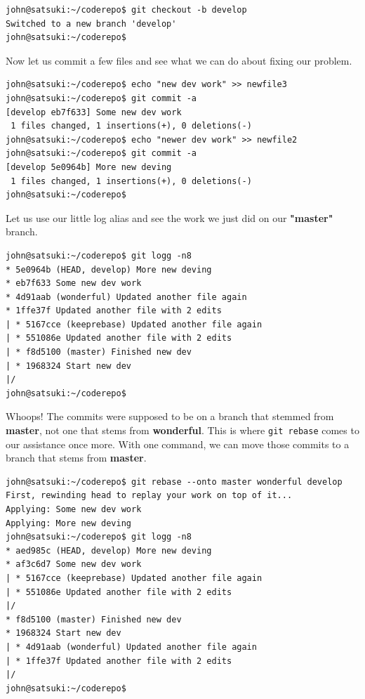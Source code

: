 \begin{Verbatim}
john@satsuki:~/coderepo$ git checkout -b develop
Switched to a new branch 'develop'
john@satsuki:~/coderepo$
\end{Verbatim}

Now let us commit a few files and see what we can do about fixing our problem.

\begin{Verbatim}
john@satsuki:~/coderepo$ echo "new dev work" >> newfile3
john@satsuki:~/coderepo$ git commit -a
[develop eb7f633] Some new dev work
 1 files changed, 1 insertions(+), 0 deletions(-)
john@satsuki:~/coderepo$ echo "newer dev work" >> newfile2
john@satsuki:~/coderepo$ git commit -a
[develop 5e0964b] More new deving
 1 files changed, 1 insertions(+), 0 deletions(-)
john@satsuki:~/coderepo$
\end{Verbatim}

Let us use our little log alias and see the work we just did on our \textbf{"master"} branch.

\begin{Verbatim}
john@satsuki:~/coderepo$ git logg -n8
* 5e0964b (HEAD, develop) More new deving
* eb7f633 Some new dev work
* 4d91aab (wonderful) Updated another file again
* 1ffe37f Updated another file with 2 edits
| * 5167cce (keeprebase) Updated another file again
| * 551086e Updated another file with 2 edits
| * f8d5100 (master) Finished new dev
| * 1968324 Start new dev
|/
john@satsuki:~/coderepo$
\end{Verbatim}

Whoops! The commits were supposed to be on a branch that stemmed from \textbf{master}, not one that stems from \textbf{wonderful}.
This is where \texttt{git rebase} comes to our assistance once more.
With one command, we can move those commits to a branch that stems from \textbf{master}.

\begin{Verbatim}
john@satsuki:~/coderepo$ git rebase --onto master wonderful develop
First, rewinding head to replay your work on top of it...
Applying: Some new dev work
Applying: More new deving
john@satsuki:~/coderepo$ git logg -n8
* aed985c (HEAD, develop) More new deving
* af3c6d7 Some new dev work
| * 5167cce (keeprebase) Updated another file again
| * 551086e Updated another file with 2 edits
|/
* f8d5100 (master) Finished new dev
* 1968324 Start new dev
| * 4d91aab (wonderful) Updated another file again
| * 1ffe37f Updated another file with 2 edits
|/
john@satsuki:~/coderepo$
\end{Verbatim}

